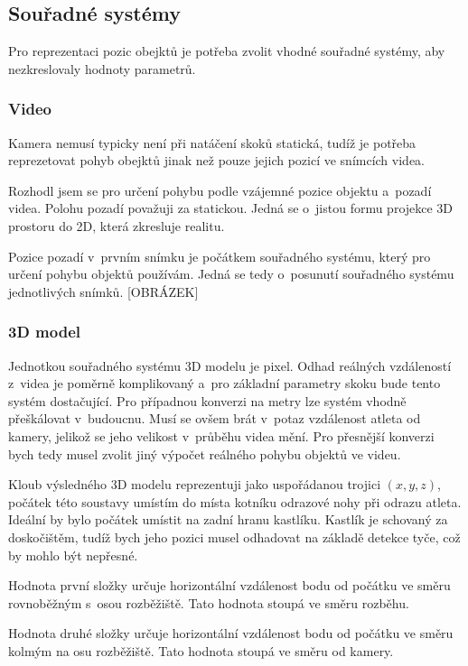 \subsection{Souřadné systémy}

Pro reprezentaci pozic obejktů je potřeba zvolit vhodné souřadné systémy, aby nezkreslovaly hodnoty parametrů.

\subsubsection{Video}

Kamera nemusí typicky není při natáčení skoků statická, tudíž je potřeba reprezetovat pohyb obejktů jinak než pouze jejich pozicí ve snímcích videa.

Rozhodl jsem se pro určení pohybu podle vzájemné pozice objektu a~pozadí videa. Polohu pozadí považuji za statickou. Jedná se o~jistou formu projekce 3D prostoru do 2D, která zkresluje realitu.

Pozice pozadí v~prvním snímku je počátkem souřadného systému, který pro určení pohybu objektů používám. Jedná se tedy o~posunutí souřadného systému jednotlivých snímků. [OBRÁZEK]

\subsubsection{3D model}

Jednotkou souřadného systému 3D modelu je pixel. Odhad reálných vzdáleností z~videa je poměrně komplikovaný a~pro základní parametry skoku bude tento systém dostačující. Pro případnou konverzi na metry lze systém vhodně přeškálovat v~budoucnu. Musí se ovšem brát v~potaz vzdálenost atleta od kamery, jelikož se jeho velikost v~průběhu videa mění. Pro přesnější konverzi bych tedy musel zvolit jiný výpočet reálného pohybu objektů ve videu.

Kloub výsledného 3D modelu reprezentuji jako uspořádanou trojici $(x,y,z)$, počátek této soustavy umístím do místa kotníku odrazové nohy při odrazu atleta. Ideální by bylo počátek umístit na zadní hranu kastlíku. Kastlík je schovaný za doskočištěm, tudíž bych jeho pozici musel odhadovat na základě detekce tyče, což by mohlo být nepřesné.

Hodnota první složky určuje horizontální vzdálenost bodu od počátku ve směru rovnoběžným s~osou rozběžiště. Tato hodnota stoupá ve směru rozběhu.

Hodnota druhé složky určuje horizontální vzdálenost bodu od počátku ve směru kolmým na osu rozběžiště. Tato hodnota stoupá ve směru od kamery.

